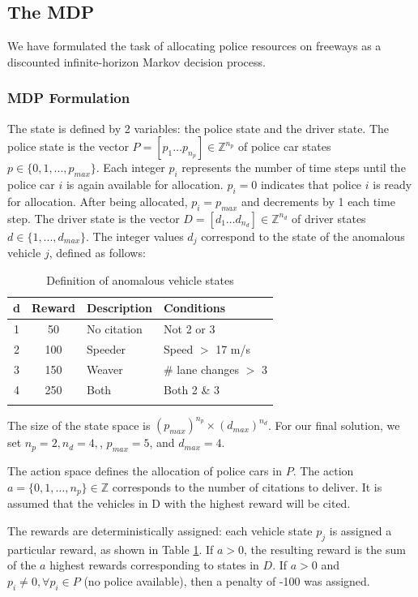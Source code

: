 \documentclass[10pt,journal]{IEEEtran}
\begin{document}
\subsection*{The MDP}
We have formulated the task of allocating police resources on freeways as a discounted infinite-horizon Markov decision process.

\subsubsection*{MDP Formulation}
The state is defined by 2 variables: the police state and the driver state. The police state is the vector $P = [p_1 \dots p_{n_p}] \in \mathbb{Z}^{n_p}$ of police car states $p \in \{0,1,...,p_{max}\}$. Each integer $p_i$ represents the number of time steps until the police car $i$ is again available for allocation. $p_i=0$ indicates that police $i$ is ready for allocation. After being allocated, $p_i = p_{max}$ and decrements by 1 each time step. The driver state is the vector $D = [d_1\dots d_{n_d}]\in \mathbb{Z}^{n_d}$ of driver states $d \in \{1,...,d_{max}\}$. The integer values $d_j$ correspond to the state of the anomalous vehicle $j$, defined as follows:

\begin{table}[h]
\centering
\begin{tabular}[h]{c c l l}
\firsthline
d & Reward & Description & Conditions \\
\hline
1 & 50 & No citation  & Not 2 or 3 \\
2 & 100 & Speeder & Speed $>$ 17 m/s \\
3 & 150 & Weaver & \# lane changes $>$ 3 \\
4 & 250 & Both & Both 2 \& 3 \\
\lasthline 
\end{tabular}
\label{tab:citations}
\caption{Definition of anomalous vehicle states}
\end{table}

\noindent The size of the state space is $(p_{max})^{n_p} \times (d_{max})^{n_d}$. For our final solution, we set $n_p = 2, n_d = 4,$, $p_{max} = 5$, and $d_{max} = 4$. 

The action space defines the allocation of police cars in $P$. The action $a = \{0,1,\dots,n_p\} \in \mathbb{Z}$ corresponds to the number of citations to deliver. It is assumed that the vehicles in D with the highest reward will be cited.

The rewards are deterministically assigned: each vehicle state $p_j$ is assigned a particular reward, as shown in Table \ref{tab:citations}. If $a>0$, the resulting reward is the sum of the $a$ highest rewards corresponding to states in $D$. If $a>0$ and $p_i \neq 0, \forall p_i \in P$ (no police available), then a penalty of -100 was assigned.
\end{document}
